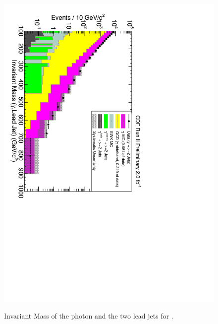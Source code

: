 \documentclass[11pt]{article}
\begin{document}
\begin{figure}
\begin{centering}
 {
\includegraphics[scale=0.7]{plot2_InvMass.pdf} }
\caption{Invariant Mass of the photon and the two lead jets for \photwojet.}
\label{fig-p2jInvMass}
\end{centering}
\end{figure}
\end{document}
